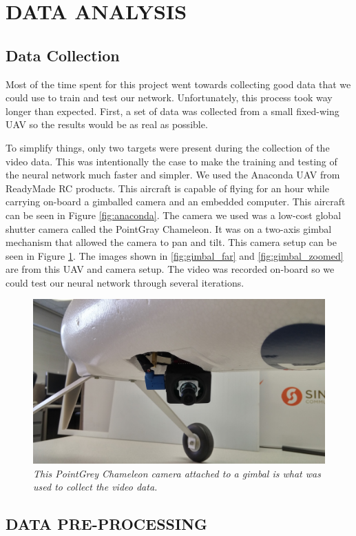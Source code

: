 \documentclass[letterpaper, 10 pt, conference]{ieeeconf}  %
\begin{document}
\section{DATA ANALYSIS} \label{DATA}

\subsection{Data Collection}
Most of the time spent for this project went towards collecting good data that we could use to train and test our network. Unfortunately, this process took way longer than expected. First, a set of data was collected from a small fixed-wing UAV so the results would be as real as possible. 

To simplify things, only two targets were present during the collection of the video data. This was intentionally the case to make the training and testing of the neural network much faster and simpler. We used the Anaconda UAV from ReadyMade RC products. This aircraft is capable of flying for an hour while carrying on-board a gimballed camera and an embedded computer. This aircraft can be seen in Figure \ref{fig:anaconda}. The camera we used was a low-cost global shutter camera called the PointGray Chameleon. It was on a two-axis gimbal mechanism that allowed the camera to pan and tilt. This camera setup can be seen in Figure \ref{fig:gimbal}. The images shown in \ref{fig:gimbal_far} and \ref{fig:gimbal_zoomed} are from this UAV and camera setup. The video was recorded on-board so we could test our neural network through several iterations.

\begin{figure}
	\begin{center}
		\includegraphics[width=.45\textwidth]{gimbal.jpg}
		\caption{\textit{This PointGrey Chameleon camera attached to a gimbal is what was used to collect the video data.}} 
		\label{fig:gimbal}
	\end{center}
\end{figure}

\subsection{DATA PRE-PROCESSING}
\end{document}
